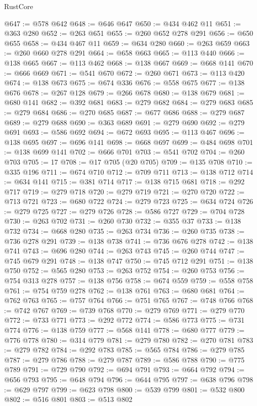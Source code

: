 \begin{lexlean}{RustCore}
\begin{coremodule}
@647 := @578 @642
@648 := @646 @647
@650 := @434 @462 @11
@651 := @363 @280
@652 := @263 @651
@655 := @260 @652 @278 @291
@656 := @650 @655
@658 := @434 @467 @11
@659 := @634 @280
@660 := @263 @659
@663 := @260 @660 @278 @291
@664 := @658 @663
@665 := @113 @440
@666 := @138 @665
@667 := @113 @462
@668 := @138 @667
@669 := @668 @141
@670 := @666 @669
@671 := @541 @670
@672 := @260 @671
@673 := @113 @420
@674 := @138 @673
@675 := @674 @336
@676 := @558 @675
@677 := @138 @676
@678 := @267 @128
@679 := @266 @678
@680 := @138 @679
@681 := @680 @141
@682 := @392 @681
@683 := @279 @682
@684 := @279 @683
@685 := @279 @684
@686 := @270 @685
@687 := @677 @686
@688 := @279 @687
@689 := @279 @688
@690 := @363 @689
@691 := @279 @690
@692 := @279 @691
@693 := @586 @692
@694 := @672 @693
@695 := @113 @467
@696 := @138 @695
@697 := @696 @141
@698 := @668 @697
@699 := @484 @698
@701 := @138 @699 @141
@702 := @666 @701
@703 := @541 @702
@704 := @260 @703
@705 := 17
@708 := @17 @705 (@20 @705)
@709 := @135 @708
@710 := @335 @196
@711 := @674 @710
@712 := @709 @711
@713 := @138 @712
@714 := @634 @141
@715 := @381 @714
@717 := @138 @715 @681
@718 := @292 @717
@719 := @279 @718
@720 := @279 @719
@721 := @270 @720
@722 := @713 @721
@723 := @680 @722
@724 := @279 @723
@725 := @634 @724
@726 := @279 @725
@727 := @279 @726
@728 := @586 @727
@729 := @704 @728
@730 := @263 @702
@731 := @260 @730
@732 := @355 @37
@733 := @138 @732
@734 := @668 @280
@735 := @263 @734
@736 := @260 @735
@738 := @736 @278 @291
@739 := @138 @738
@741 := @736 @676 @278
@742 := @138 @741
@743 := @696 @280
@744 := @263 @743
@745 := @260 @744
@747 := @745 @679 @291
@748 := @138 @747
@750 := @745 @712 @291
@751 := @138 @750
@752 := @565 @280
@753 := @263 @752
@754 := @260 @753
@756 := @754 @313 @278
@757 := @138 @756
@758 := @674 @559
@759 := @558 @758
@761 := @754 @759 @278
@762 := @138 @761
@763 := @680 @681
@764 := @762 @763
@765 := @757 @764
@766 := @751 @765
@767 := @748 @766
@768 := @742 @767
@769 := @739 @768
@770 := @279 @769
@771 := @279 @770
@772 := @733 @771
@773 := @292 @772
@774 := @586 @773
@775 := @731 @774
@776 := @138 @759
@777 := @568 @141
@778 := @680 @777
@779 := @776 @778
@780 := @314 @779
@781 := @279 @780
@782 := @270 @781
@783 := @279 @782
@784 := @292 @783
@785 := @565 @784
@786 := @279 @785
@787 := @279 @786
@788 := @279 @787
@789 := @586 @788
@790 := @775 @789
@791 := @729 @790
@792 := @694 @791
@793 := @664 @792
@794 := @656 @793
@795 := @648 @794
@796 := @644 @795
@797 := @638 @796
@798 := @629 @797
@799 := @623 @798
@800 := @539 @799
@801 := @532 @800
@802 := @516 @801
@803 := @513 @802

\end{coremodule}
\end{lexlean}
